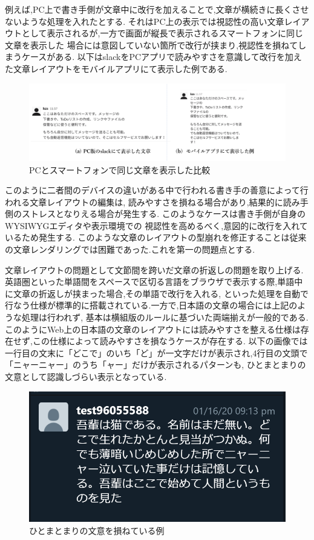 例えば,PC上で書き手側が文章中に改行を加えることで,文章が横続きに長くさせないような処理を入れたとする.
それはPC上の表示では視認性の高い文章レイアウトとして表示されるが,一方で画面が縦長で表示されるスマートフォンに同じ文章を表示した
場合には意図していない箇所で改行が挟まり,視認性を損ねてしまうケースがある.
以下はslack\footnotemark[2]をPCアプリで読みやすさを意識して改行を加えた文章レイアウトをモバイルアプリにて表示した例である.



\begin{figure}[H]
    \centering
    \label{fig:image5}
    \includegraphics[width=0.9\columnwidth]{image/01/img3.png}
    \caption[PCとスマートフォンで同じ文章を表示した比較] {PCとスマートフォンで同じ文章を表示した比較}
\end{figure}

このように二者間のデバイスの違いがある中で行われる書き手の善意によって行われる文章レイアウトの編集は,
読みやすさを損ねる場合があり,結果的に読み手側のストレスとなりえる場合が発生する.
このようなケースは書き手側が自身のWYSIWYGエディタや表示環境での
視認性を高めるべく,意図的に改行を入れているため発生する.
このような文章のレイアウトの型崩れを修正することは従来の文章レンダリングでは困難であった.これを第一の問題点とする.

文章レイアウトの問題として文節間を跨いだ文章の折返しの問題を取り上げる.
英語圏といった単語間をスペースで区切る言語をブラウザで表示する際,単語中に文章の折返しが挟まった場合,その単語で改行を入れる,
といった処理を自動で行なう仕様が標準的に搭載されている.一方で,日本語の文章の場合には上記のような処理は行われず,
基本は横組版のルールに基づいた両端揃えが一般的である.
このようにWeb上の日本語の文章のレイアウトには読みやすさを整える仕様は存在せず,この仕様によって読みやすさを損なうケースが存在する.
以下の画像では一行目の文末に「どこで」のいち「ど」が一文字だけが表示され,4行目の文頭で「ニャーニャー」のうち「ャー」だけが表示されるパターンも,
ひとまとまりの文意として認識しづらい表示となっている.

\begin{figure}[H]
        \centering
        \label{fig:sokoneteiru}
        \includegraphics[width=0.7\columnwidth]{image/01/img5.png}
        \caption[ひとまとまりの文意を損ねている例] {ひとまとまりの文意を損ねている例}
\end{figure}

